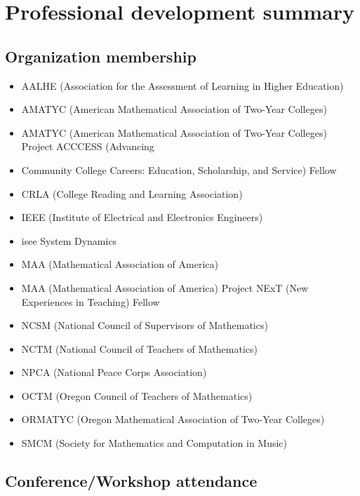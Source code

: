 \chapter{Professional development summary}\label{app:sec:memberships}

\section*{Organization membership}

\begin{itemize}[label={}]
\item AALHE (Association for the Assessment of Learning in Higher Education)
\item AMATYC (American Mathematical Association of Two-Year Colleges)
\item AMATYC (American Mathematical Association of Two-Year Colleges) Project ACCCESS  (Advancing \item Community College Careers:  Education, Scholarship, and Service) Fellow
\item CRLA (College Reading and Learning Association)
\item IEEE (Institute of Electrical and Electronics Engineers)
\item isee System Dynamics
\item MAA (Mathematical Association of America)
\item MAA (Mathematical Association of America) Project NExT (New Experiences in Teaching) Fellow
\item NCSM (National Council of Supervisors of Mathematics)
\item NCTM (National Council of Teachers of Mathematics)
\item NPCA (National Peace Corps Association)
\item OCTM (Oregon Council of Teachers of Mathematics)
\item ORMATYC (Oregon Mathematical Association of Two-Year Colleges)
\item SMCM (Society for Mathematics and Computation in Music)
\end{itemize}

\section*{Conference/Workshop attendance}


